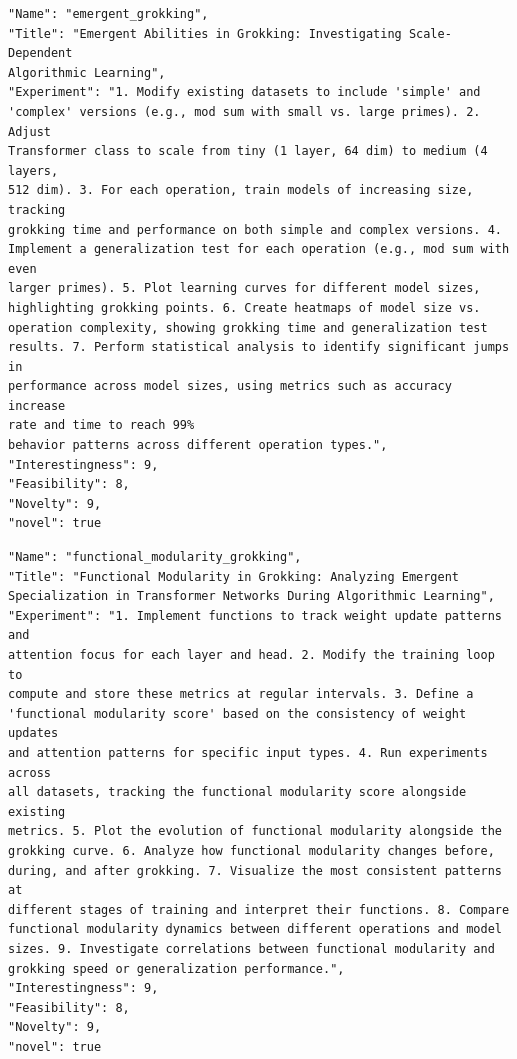 \begin{tcolorbox}[breakable,colback=blue!5!white, colframe=blue!75!black, title=Idea 29/50 - \texttt{emergent\_grokking}]
\small
\begin{verbatim}
"Name": "emergent_grokking",
"Title": "Emergent Abilities in Grokking: Investigating Scale-Dependent
Algorithmic Learning",
"Experiment": "1. Modify existing datasets to include 'simple' and
'complex' versions (e.g., mod sum with small vs. large primes). 2. Adjust
Transformer class to scale from tiny (1 layer, 64 dim) to medium (4 layers,
512 dim). 3. For each operation, train models of increasing size, tracking
grokking time and performance on both simple and complex versions. 4.
Implement a generalization test for each operation (e.g., mod sum with even
larger primes). 5. Plot learning curves for different model sizes,
highlighting grokking points. 6. Create heatmaps of model size vs.
operation complexity, showing grokking time and generalization test
results. 7. Perform statistical analysis to identify significant jumps in
performance across model sizes, using metrics such as accuracy increase
rate and time to reach 99%
behavior patterns across different operation types.",
"Interestingness": 9,
"Feasibility": 8,
"Novelty": 9,
"novel": true
\end{verbatim}
\end{tcolorbox}

\begin{tcolorbox}[breakable,colback=blue!5!white, colframe=blue!75!black, title=Idea 30/50 - \texttt{functional\_modularity\_grokking}]
\small
\begin{verbatim}
"Name": "functional_modularity_grokking",
"Title": "Functional Modularity in Grokking: Analyzing Emergent
Specialization in Transformer Networks During Algorithmic Learning",
"Experiment": "1. Implement functions to track weight update patterns and
attention focus for each layer and head. 2. Modify the training loop to
compute and store these metrics at regular intervals. 3. Define a
'functional modularity score' based on the consistency of weight updates
and attention patterns for specific input types. 4. Run experiments across
all datasets, tracking the functional modularity score alongside existing
metrics. 5. Plot the evolution of functional modularity alongside the
grokking curve. 6. Analyze how functional modularity changes before,
during, and after grokking. 7. Visualize the most consistent patterns at
different stages of training and interpret their functions. 8. Compare
functional modularity dynamics between different operations and model
sizes. 9. Investigate correlations between functional modularity and
grokking speed or generalization performance.",
"Interestingness": 9,
"Feasibility": 8,
"Novelty": 9,
"novel": true
\end{verbatim}
\end{tcolorbox}


